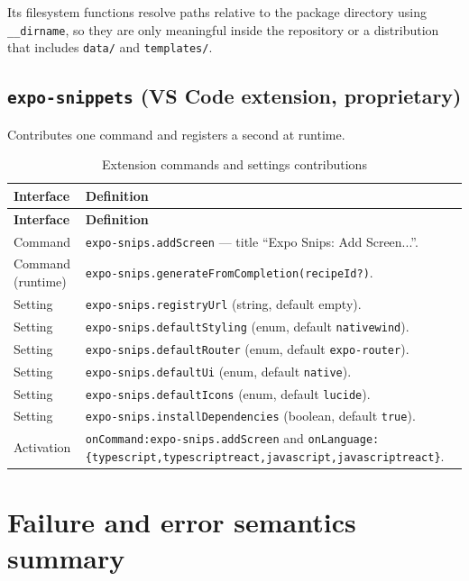 Its filesystem functions resolve paths relative to the package directory using
\texttt{\_\_dirname}, so they are only meaningful inside the repository or a
distribution that includes \texttt{data/} and \texttt{templates/}.

\subsection*{\texttt{expo-snippets} (VS Code extension, proprietary)}

Contributes one command and registers a second at runtime.

\begin{longtable}{@{}L{5.6cm}L{8.6cm}@{}}
\caption{Extension commands and settings contributions}\\
\toprule
\textbf{Interface} & \textbf{Definition} \\
\midrule
\endfirsthead
\toprule
\textbf{Interface} & \textbf{Definition} \\
\midrule
\endhead
Command & \texttt{expo-snips.addScreen} --- title ``Expo Snips: Add Screen...''. \\
Command (runtime) & \texttt{expo-snips.generateFromCompletion(recipeId?)}. \\
Setting & \texttt{expo-snips.registryUrl} (string, default empty). \\
Setting & \texttt{expo-snips.defaultStyling} (enum, default \texttt{nativewind}). \\
Setting & \texttt{expo-snips.defaultRouter} (enum, default \texttt{expo-router}). \\
Setting & \texttt{expo-snips.defaultUi} (enum, default \texttt{native}). \\
Setting & \texttt{expo-snips.defaultIcons} (enum, default \texttt{lucide}). \\
Setting & \texttt{expo-snips.installDependencies} (boolean, default \texttt{true}). \\
Activation & \texttt{onCommand:expo-snips.addScreen} and
\texttt{onLanguage:\{typescript,\allowbreak typescriptreact,\allowbreak javascript,\allowbreak javascriptreact\}}. \\
\bottomrule
\end{longtable}

\section{Failure and error semantics summary}

